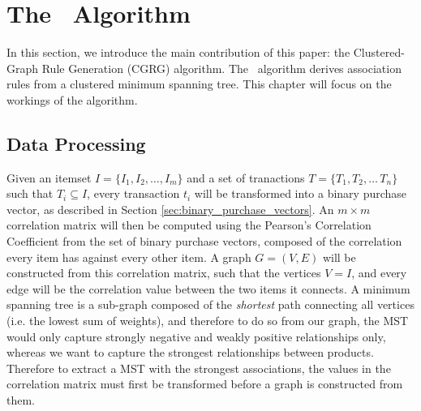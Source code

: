 
\chapter{The \algo\ Algorithm}
In this section, we introduce the main contribution of this paper: the Clustered-Graph Rule Generation (CGRG) algorithm. The \algo\ algorithm derives association rules from a clustered minimum spanning tree. This chapter will focus on the workings of the algorithm.

\section{Data Processing}
\label{sec:algo_data}
Given an itemset $I = \{I_1, I_2,\dots,I_m\}$ and a set of tranactions $T = \{T_1,T_2,\dots\,T_n\}$ such that $T_i \subseteq I$, every transaction $t_i$ will be transformed into a binary purchase vector, as described in Section \ref{sec:binary_purchase_vectors}. An $m \times m$ correlation matrix will then be computed using the Pearson's Correlation Coefficient from the set of binary purchase vectors, composed of the correlation every item has against every other item. A graph $G = (V,E)$ will be constructed from this correlation matrix, such that the vertices $V=I$, and every edge will be the correlation value between the two items it connects. A minimum spanning tree is a sub-graph composed of the \textit{shortest} path connecting all vertices (i.e. the lowest sum of weights), and therefore to do so from our graph, the MST would only capture strongly negative and weakly positive relationships only, whereas we want to capture the strongest relationships between products. Therefore to extract a MST with the strongest associations, the values in the correlation matrix must first be transformed before a graph is constructed from them.

